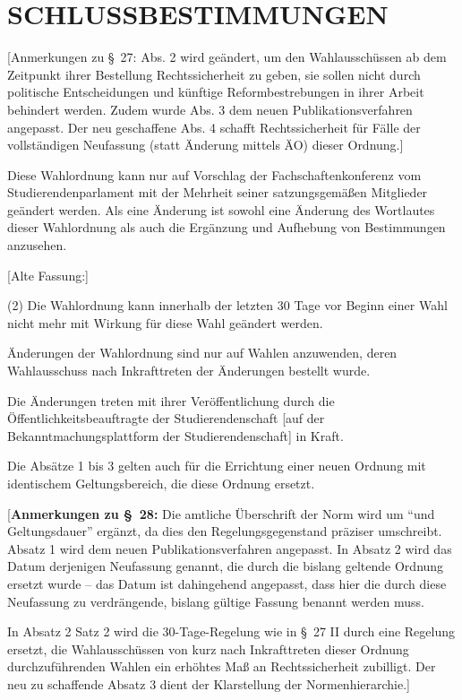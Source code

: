 \documentclass[%
draft,%
multilinesections%
]{fswo}
\newcommand\newT[1]  {{\color{Green}[#1]}}
\newcommand\bemFr[1] {{\color{Red}[#1]}}
\newcommand\bemFe[1] {{\color{Cyan}[#1]}}
\newcommand\remark[1]{\begin{addmargin}{1cm}#1\end{addmargin}}
\newcommand\newT[1]{#1}
\newcommand\bemFr[1]{}%
\newcommand\bemFe[1]{}%
\newcommand\remark[1]{}
\begin{document}
\section{SCHLUSSBESTIMMUNGEN}
\bemFr{Anmerkungen zu \S~27: Abs. 2 wird geändert, um den Wahlausschüssen ab dem Zeitpunkt ihrer Bestellung Rechtssicherheit zu geben, sie sollen nicht durch politische Entscheidungen und künftige Reformbestrebungen in ihrer Arbeit behindert werden.
Zudem wurde Abs. 3 dem neuen Publikationsverfahren angepasst. Der neu geschaffene Abs. 4 schafft Rechtssicherheit für Fälle der vollständigen Neufassung (statt Änderung mittels ÄO) dieser Ordnung.}

\begin{contract}
Diese Wahlordnung kann nur auf Vorschlag der Fachschaftenkonferenz vom Studierendenparlament mit der Mehrheit seiner satzungsgemäßen Mitglieder geändert werden.
Als eine Änderung ist sowohl eine Änderung des Wortlautes dieser Wahlordnung als auch die Ergänzung und Aufhebung von Bestimmungen anzusehen.

\remark{%
\bemFe{Alte Fassung:}

\color{Gray}
(2) Die Wahlordnung kann innerhalb der letzten 30 Tage vor Beginn einer Wahl nicht mehr mit Wirkung für diese Wahl geändert werden.}

Änderungen der Wahlordnung sind nur auf Wahlen anzuwenden, deren Wahlausschuss nach Inkrafttreten der Änderungen bestellt wurde.

Die Änderungen treten mit ihrer Veröffentlichung durch die Öffentlichkeitsbeauftragte der Studierendenschaft \newT{auf der Bekanntmachungsplattform der Studierendenschaft} in Kraft.

Die Absätze 1 bis 3 gelten auch für die Errichtung einer neuen Ordnung mit identischem Geltungsbereich, die diese Ordnung ersetzt.
\end{contract}

\bemFr{\textbf{Anmerkungen zu \S~28:}
Die amtliche Überschrift der Norm wird um \enquote{und Geltungsdauer} ergänzt, da dies den Regelungsgegenstand präziser umschreibt.
Absatz 1 wird dem neuen Publikationsverfahren angepasst.
In Absatz 2 wird das Datum derjenigen Neufassung genannt, die durch die bislang geltende Ordnung ersetzt wurde –
das Datum ist dahingehend angepasst, dass hier die durch diese Neufassung zu verdrängende, bislang gültige Fassung benannt werden muss.

In Absatz 2 Satz 2 wird die 30-Tage-Regelung wie in \S~27 II durch eine Regelung ersetzt, die Wahlausschüssen von kurz nach Inkrafttreten dieser Ordnung durchzuführenden Wahlen ein erhöhtes Maß an Rechtssicherheit zubilligt. Der neu zu schaffende Absatz 3 dient der Klarstellung der Normenhierarchie.}
\end{document}
